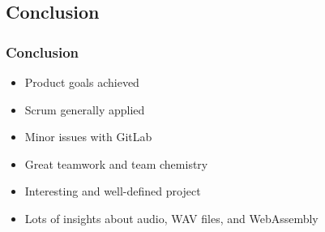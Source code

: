 \subsection{Conclusion}\label{subsec:conclusion}
\begin{frame}
    \frametitle{Conclusion}
    \begin{itemize}
        \large
        \item Product goals achieved
        \item Scrum generally applied
        \item Minor issues with GitLab
        \item Great teamwork and team chemistry
        \item Interesting and well-defined project
        \item Lots of insights about audio, WAV files, and WebAssembly
    \end{itemize}
\end{frame}

